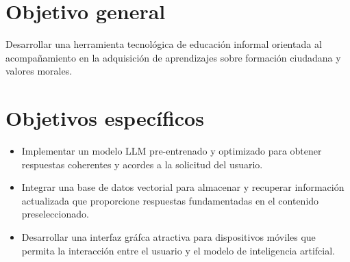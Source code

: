 \section{Objetivo general}
Desarrollar una herramienta tecnológica de educación informal orientada al acompañamiento en la adquisición de aprendizajes sobre formación ciudadana y valores morales.

\section{Objetivos específicos}
\begin{itemize}
\item Implementar un modelo LLM pre-entrenado y optimizado para obtener respuestas coherentes y acordes a la solicitud del usuario.
\item Integrar una base de datos vectorial para almacenar y recuperar información actualizada que proporcione respuestas fundamentadas en el contenido preseleccionado.
\item Desarrollar una interfaz gráfca atractiva para dispositivos móviles que permita la interacción entre el usuario y el modelo de inteligencia artifcial.
\end{itemize}